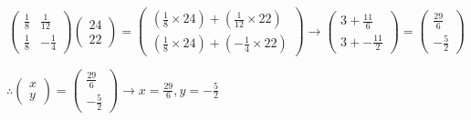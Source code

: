 \documentclass{article}
\begin{document}
\[
	\begin{pmatrix}
		\frac{1}{8} & \frac{1}{12}\\
		\frac{1}{8} & -\frac{1}{4}
	\end{pmatrix}
	\begin{pmatrix}
		24\\
		22
	\end{pmatrix}

	=
	\begin{pmatrix}
		(\frac{1}{8}\times24)+(\frac{1}{12}\times22)\\
		(\frac{1}{8}\times24)+(-\frac{1}{4}\times22)
	\end{pmatrix}
	\rightarrow
	\begin{pmatrix}
		3 + \frac{11}{6}\\
		3 + -\frac{11}{2}
	\end{pmatrix}
	=
	\begin{pmatrix}
		\frac{29}{6}\\
		-\frac{5}{2}
	\end{pmatrix}
\]
\begin{center}\vspace{0.5cm}$\therefore
	\begin{pmatrix}
		x\\
		y
	\end{pmatrix}
	= 
	\begin{pmatrix}
		\frac{29}{6}\\
		-\frac{5}{2}
	\end{pmatrix}
	\rightarrow
x = \frac{29}{6}, y = -\frac{5}{2}$\end{center}
\end{document}
